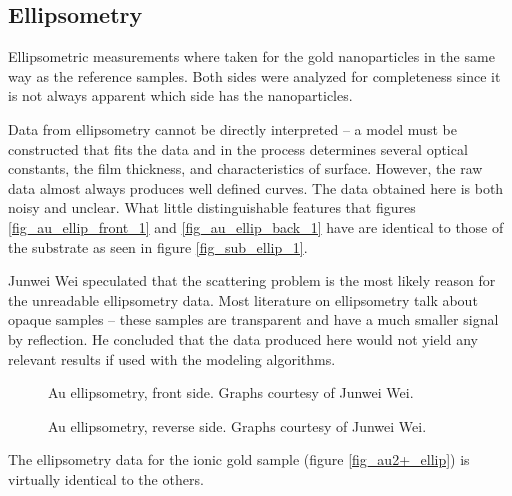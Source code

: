 \subsection{Ellipsometry}
Ellipsometric measurements where taken for the gold nanoparticles in the same way as the reference samples. Both sides were analyzed for completeness since it is not always apparent which side has the nanoparticles.

Data from ellipsometry cannot be directly interpreted -- a model must be constructed that fits the data and in the process determines several optical constants, the film thickness, and characteristics of surface. However, the raw data almost always produces well defined curves. The data obtained here is both noisy and unclear. What little distinguishable features that figures \ref{fig_au_ellip_front_1} and \ref{fig_au_ellip_back_1} have are identical to those of the substrate as seen in figure \ref{fig_sub_ellip_1}.

Junwei Wei speculated that the scattering problem is the most likely reason for the unreadable ellipsometry data. Most literature on ellipsometry talk about opaque samples -- these samples are transparent and have a much smaller signal by reflection. He concluded that the data produced here would not yield any relevant results if used with the modeling algorithms.

\begin{figure}[h]
  \centering
  \caption[Au ellipsometry, front side.]{Au ellipsometry, front side. Graphs courtesy of Junwei Wei.\label{fig_au_ellip_front}}
\end{figure}

\begin{figure}[h]
  \centering
  \caption[Au ellipsometry, reverse side.]{Au ellipsometry, reverse side. Graphs courtesy of Junwei Wei.\label{fig_au_ellip_back}}
\end{figure}

The ellipsometry data for the ionic gold sample (figure \ref{fig_au2+_ellip}) is virtually identical to the others.

